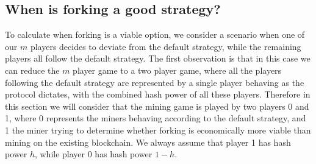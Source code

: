 %
%

\subsection{When is forking a good strategy?}
\label{sec-forkingstrategies}

To calculate when forking is a viable option, we consider a scenario when one of our $m$ players decides to deviate from the default strategy, while the remaining players all follow the default strategy. 
The first observation is that in this case we can reduce the $m$ player game to a two player game, where all the players following the default strategy are represented by a single player behaving as the protocol dictates, with the combined hash power of all these players. Therefore in this section we will consider that the mining game is played by two players 0 and 1, where 0 represents the miners behaving according to the default strategy, and 1 the miner trying to determine whether forking is economically more viable than mining on the existing blockchain. We always assume that player 1 has hash power $h$, while player 0 has hash power $1-h$.

